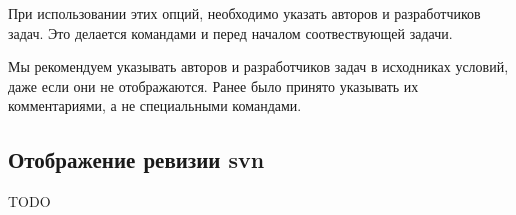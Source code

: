 \documentclass[11pt,a4paper,oneside]{article}
\begin{document}
При использовании этих опций, необходимо указать авторов и разработчиков задач.
Это делается командами \unskip{}
и \unskip{} перед началом соотвествующей
задачи.

Мы рекомендуем указывать авторов и разработчиков задач в исходниках условий, даже если
они не отображаются. Ранее было принято указывать их комментариями, а не специальными командами.

\subsection{Отображение ревизии svn}


TODO
\end{document}
